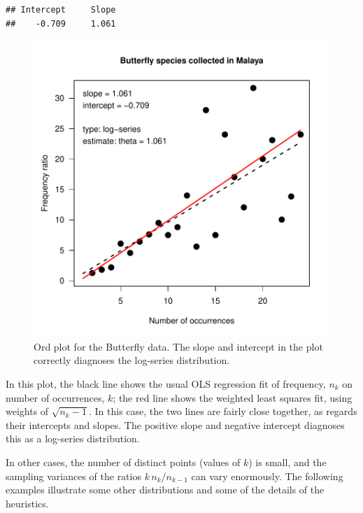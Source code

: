 \documentclass[11pt]{book}
\renewenvironment{knitrout}{\small\renewcommand{\baselinestretch}{.85}}{} %
\begin{document}
\begin{knitrout}
\color{fgcolor}\begin{kframe}
\begin{alltt}
 \hlkwb{<-} 
                 \hlstd{=} \hlstd{,}
                \hlstd{=}\hlstd{(}\hlstd{=}\hlstd{),} \hlstd{=}\hlstd{)}
\end{alltt}
\begin{verbatim}
## Intercept     Slope 
##    -0.709     1.061
\end{verbatim}
\end{kframe}\begin{figure}[!htbp]


\centerline{\includegraphics[width=.5\textwidth]{ch03/fig/ordplot1} }

\caption[Ord plot for the Butterfly data]{Ord plot for the Butterfly data. The slope and intercept in the plot correctly diagnoses the log-series distribution.\label{fig:ordplot1}}
\end{figure}


\end{knitrout}
In this plot, the black line shows the usual OLS regression fit of
frequency, $n_k$ on number of occurrences, $k$;  the red line shows
the weighted least squares fit, using weights of $\sqrt{n_k-1}$.
In this case, the two lines are fairly close together, as regards
their intercepts and slopes.  The positive slope and negative intercept
diagnoses this as a log-series distribution.

In other cases, the number of distinct points (values of $k$) is small,
and the sampling variances of the ratios $ k \, n_k / n_{k-1}$ can vary 
enormously.  The following examples illustrate some other distributions
and some of the details of the heuristics.
\end{document}

